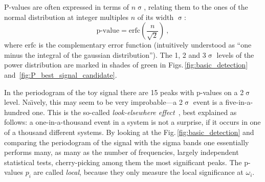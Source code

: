 
P-values are often expressed in terms of $n\upsigma$, relating them to the ones of the normal distribution at integer multiples $n$ of its width $\upsigma$:
\begin{equation}
  \text{p-value} = \mathrm{erfc}\left( \frac{n}{\sqrt{2}} \right)\ ,
\end{equation}
where $\mathrm{erfc}$ is the complementary error function (intuitively understood as ``one minus the integral of the gaussian distribution'').
The 1, 2 and 3$\upsigma$ levels of the power distribution are marked in shades of green in Figs.\,\ref{fig:basic_detection} and~\ref{fig:P_best_signal_candidate}.

In the periodogram of the toy signal there are 15 peaks with p-values on a 2$\upsigma$ level.
Na\"\i vely, this may seem to be very improbable---a 2$\upsigma$ event is a five-in-a-hundred one.
This is the so-called \emph{look-elsewhere effect}~\cite{PDG2016}, best explained as follows: a one-in-a-thousand event in a system is not a surprise, if it occurs in one of a thousand different systems.
By looking at the Fig.\,\ref{fig:basic_detection} and comparing the periodogram of the signal with the sigma bands one essentially performs many, as many as the number of frequencies, largely independent statistical tests, cherry-picking among them the most significant peaks.
The p-values $p_i$ are called \emph{local}, because they only measure the local significance at $\omega_i$.

